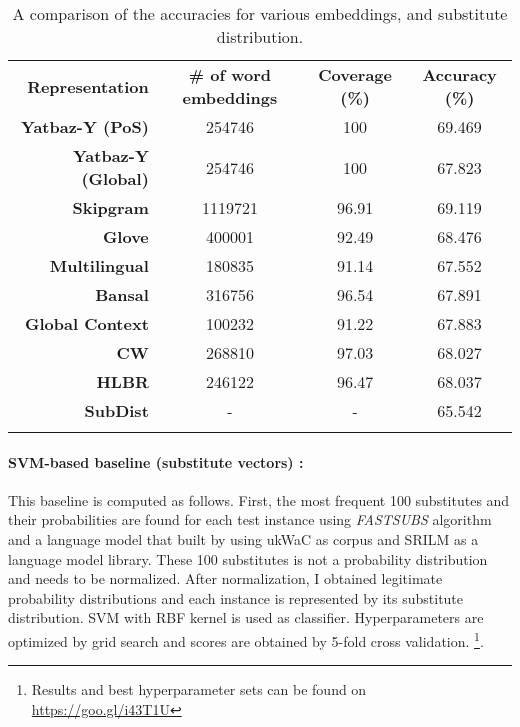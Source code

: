 

\begin{table}
\begin{center}
    \begin{tabular}{ r | c | c | c }  \Xhline{2\arrayrulewidth}  
    \bf Representation & \bf \# of word embeddings & \bf Coverage (\%) & \bf Accuracy (\%) \\  \Xhline{2\arrayrulewidth}
    \bf Yatbaz-Y (PoS) & 254746 & 100 & 69.469 \\
    \bf Yatbaz-Y (Global) & 254746 & 100 & 67.823 \\ \hline
    \bf Skipgram & 1119721 & 96.91 & 69.119  \\ 
    \bf Glove & 400001 &  92.49 & 68.476  \\ 
    \bf Multilingual & 180835 & 91.14 & 67.552 \\ 
    \bf Bansal & 316756 & 96.54 & 67.891 \\ 
    \bf Global Context & 100232 & 91.22 & 67.883 \\ 
    \bf CW & 268810 & 97.03 & 68.027 \\ 
    \bf HLBR & 246122 & 96.47 & 68.037 \\ \hline 
    \bf SubDist & - & - & 65.542 \\  \Xhline{2\arrayrulewidth} 
    \end{tabular}
\end{center}
    \caption{\label{table:semeval10-svm-baseline} A comparison of the accuracies for various embeddings, and substitute distribution.}
\end{table}

\paragraph{SVM-based baseline (substitute vectors) :} This baseline is computed as follows. First, the most frequent 100 substitutes and their probabilities are found for each test instance using \emph{FASTSUBS} algorithm \cite{fastsubs} and a language model that built by using ukWaC \cite{ukWaC} as corpus and SRILM \cite{stolcke02srilm} as a language model library. These 100 substitutes is not a probability distribution and needs to be normalized. After normalization, I obtained legitimate probability distributions and each instance is represented by its substitute distribution. SVM with RBF kernel is used as classifier. Hyperparameters are optimized by grid search and scores are obtained by 5-fold cross validation. \footnote{Results and best hyperparameter sets can be found on \href{https://goo.gl/i43T1U}{https://goo.gl/i43T1U}}.

